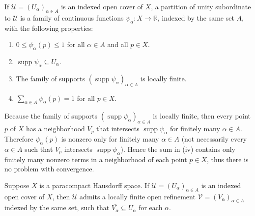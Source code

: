 If $\mathscr{U} = {(U_{\alpha})}_{\alpha\in A}$ is an indexed open cover of $X$, a partition of unity subordinate to $\mathscr{U}$ is a family of continuous functions $\psi_{\alpha}: X\to \mathbb{R}$, indexed by the same set $A$, with the following properties:
\begin{enumerate}[label={(\roman*)},itemsep=0pt]
	\item $0 \leq \psi_{\alpha}(p) \leq 1$ for all $\alpha\in A$ and all $p\in X$.
	\item $\operatorname{supp} \psi_{\alpha} \subseteq U_{\alpha}$.
	\item The family of supports ${(\operatorname{supp}\psi_{\alpha})}_{\alpha\in A}$ is locally finite.
	\item $\sum_{\alpha\in A}\psi_{\alpha}(p) = 1$ for all $p\in X$.
\end{enumerate}

Because the family of supports ${(\operatorname{supp} \psi_{\alpha})}_{\alpha\in A}$ is locally finite, then every point $p$ of $X$ has a neighborhood $V_{p}$ that intersects $\operatorname{supp} \psi_{\alpha}$ for finitely many $\alpha\in A$. Therefore $\psi_{\alpha}(p)$ is nonzero only for finitely many $\alpha\in A$ (not necessarily every $\alpha\in A$ such that $V_{p}$ intersects $\operatorname{supp} \psi_{\alpha}$). Hence the sum in (iv) contains only finitely many nonzero terms in a neighborhood of each point $p\in X$, thus there is no problem with convergence.

\begin{lemma}{4.84}
	Suppose $X$ is a paracompact Hausdorff space. If $\mathscr{U} = {(U_{\alpha})}_{\alpha\in A}$ is an indexed open cover of $X$, then $\mathscr{U}$ admits a locally finite open refinement $\mathcal{V} = {(V_{\alpha})}_{\alpha\in A}$ indexed by the same set, such that $\overline{V_{\alpha}} \subseteq U_{\alpha}$ for each $\alpha$.
\end{lemma}


